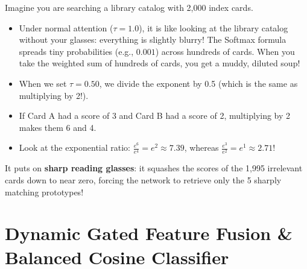 \documentclass[11pt,a4paper]{article}
\begin{document}
\begin{callout}[Student Perspective: Why Temperature $\tau = 0.50$ is Like Prescription Glasses]
Imagine you are searching a library catalog with 2,000 index cards.
\begin{itemize}[noitemsep]
    \item Under normal attention ($\tau = 1.0$), it is like looking at the library catalog without your glasses: everything is slightly blurry! The Softmax formula spreads tiny probabilities (e.g., $0.001$) across hundreds of cards. When you take the weighted sum of hundreds of cards, you get a muddy, diluted soup!
    \item When we set $\tau = 0.50$, we divide the exponent by 0.5 (which is the same as multiplying by 2!).
    \item If Card A had a score of 3 and Card B had a score of 2, multiplying by 2 makes them 6 and 4.
    \item Look at the exponential ratio: $\frac{e^6}{e^4} = e^2 \approx 7.39$, whereas $\frac{e^3}{e^2} = e^1 \approx 2.71$!
\end{itemize}
It puts on \textbf{sharp reading glasses}: it squashes the scores of the 1,995 irrelevant cards down to near zero, forcing the network to retrieve only the 5 sharply matching prototypes!
\end{callout}

\newpage

\section{Dynamic Gated Feature Fusion \& Balanced Cosine Classifier}
\label{sec:fusion-classifier}
\end{document}
